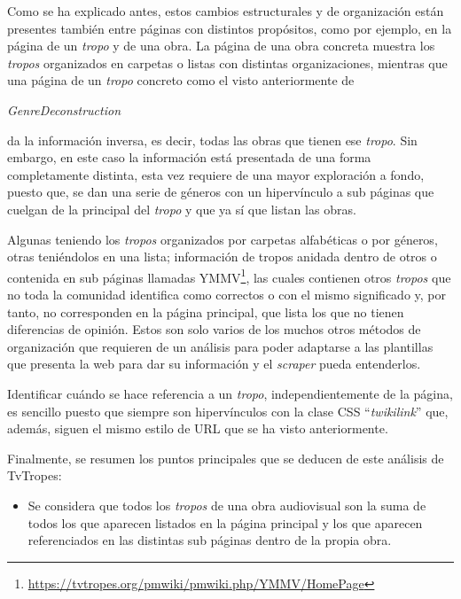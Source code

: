 Como se ha explicado antes, estos cambios estructurales y de organización están
presentes también entre páginas con distintos propósitos, como por ejemplo, en
la página de un \textit{tropo} y de una obra. La página de una obra concreta
muestra los \textit{tropos} organizados en carpetas o listas con distintas
organizaciones, mientras que una página de un \textit{tropo} concreto como el
visto anteriormente de
\begin{otherlanguage}{english}\textit{GenreDeconstruction}\end{otherlanguage} da
la información inversa, es decir, todas las obras que tienen ese \textit{tropo}.
Sin embargo, en este caso la información está presentada de una forma
completamente distinta, esta vez requiere de una mayor exploración a fondo,
puesto que, se dan una serie de géneros con un hipervínculo a sub páginas que
cuelgan de la principal del \textit{tropo} y que ya sí que listan las obras.

Algunas teniendo los \textit{tropos} organizados por carpetas alfabéticas o por
géneros, otras teniéndolos en una lista; información de tropos anidada dentro de
otros o contenida en sub páginas llamadas
YMMV\footnote{\url{https://tvtropes.org/pmwiki/pmwiki.php/YMMV/HomePage}}, las
cuales contienen otros \textit{tropos} que no toda la comunidad identifica como
correctos o con el mismo significado y, por tanto, no corresponden en la página
principal, que lista los que no tienen diferencias de opinión. Estos son solo
varios de los muchos otros métodos de organización que requieren de un análisis
para poder adaptarse a las plantillas que presenta la web para dar su
información y el \textit{scraper} pueda entenderlos.

Identificar cuándo se hace referencia a un \textit{tropo}, independientemente de
la página, es sencillo puesto que siempre son hipervínculos con la clase CSS
``\textit{twikilink}'' que, además, siguen el mismo estilo de URL que se ha
visto anteriormente.

Finalmente, se resumen los puntos principales que se deducen de este análisis de
TvTropes:
\begin{itemize}
    \item Se considera que todos los \textit{tropos} de una obra audiovisual son
    la suma de todos los que aparecen listados en la página principal y los que
    aparecen referenciados en las distintas sub páginas dentro de la propia
    obra.
\end{itemize}